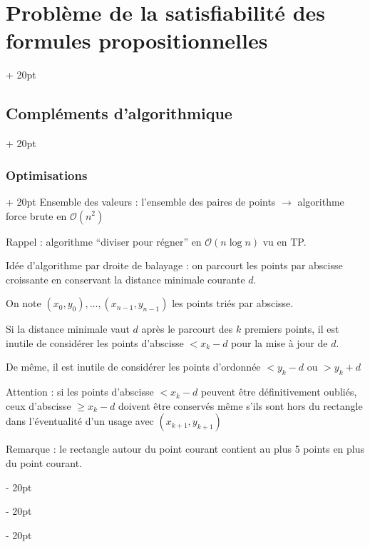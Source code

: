 \documentclass[a4paper, 12pt, twoside]{article}
\renewcommand{\ge}{\geqslant}
\newcommand{\ind}[1][20pt]{\advance\leftskip + #1}
\newcommand{\deind}[1][20pt]{\advance\leftskip - #1}
\newenvironment{indt}[2][20pt]{#2 \par \ind[#1]}{\par \deind} %
\begin{document}
\begin{indt}{\section{Problème de la satisfiabilité des formules propositionnelles}}
\begin{indt}{\subsection{Compléments d'algorithmique}}
\begin{indt}{\subsubsection{Optimisations}}
                Ensemble des valeurs : l'ensemble des paires de points $\rightarrow$ algorithme force brute en $\mathcal O(n^2)$
                
                Rappel : algorithme ``diviser pour régner'' en $\mathcal O(n\log n)$ vu en TP.
                
                Idée d'algorithme par droite de balayage : on parcourt les points par abscisse croissante en conservant la distance minimale courante $d$.
                
                On note $(x_0, y_0), \ldots, (x_{n - 1}, y_{n - 1})$ les points triés par abscisse.
                
                Si la distance minimale vaut $d$ après le parcourt des $k$ premiers points, il est inutile de considérer les points d'abscisse $< x_k - d$ pour la mise à jour de $d$.
                
                De même, il est inutile de considérer les points d'ordonnée $< y_k - d$ ou $> y_k + d$
                
                \begin{center}
                \end{center}
                
                Attention : si les points d'abscisse $< x_k - d$ peuvent être définitivement oubliés, ceux d'abscisse $\ge x_k - d$ doivent être conservés même s'ils sont hors du rectangle dans l'éventualité d'un usage avec $(x_{k + 1}, y_{k + 1}                )$
                
                Remarque :
                le rectangle autour du point courant contient au plus 5 points en plus du point courant.
                
                \begin{center}
\end{center}
\end{indt}
\end{indt}
\end{indt}
\end{document}
